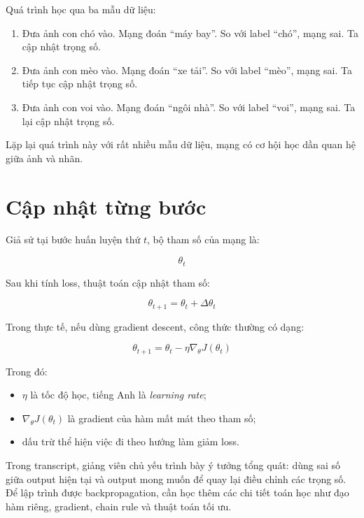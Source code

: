 \documentclass[12pt,a4paper]{report}
\begin{document}
\begin{vidu}
Quá trình học qua ba mẫu dữ liệu:

\begin{enumerate}
    \item Đưa ảnh con chó vào. Mạng đoán ``máy bay''. So với label ``chó'', mạng sai. Ta cập nhật trọng số.
    \item Đưa ảnh con mèo vào. Mạng đoán ``xe tải''. So với label ``mèo'', mạng sai. Ta tiếp tục cập nhật trọng số.
    \item Đưa ảnh con voi vào. Mạng đoán ``ngôi nhà''. So với label ``voi'', mạng sai. Ta lại cập nhật trọng số.
\end{enumerate}

Lặp lại quá trình này với rất nhiều mẫu dữ liệu, mạng có cơ hội học dần quan hệ giữa ảnh và nhãn.
\end{vidu}

\section{Cập nhật từng bước}

Giả sử tại bước huấn luyện thứ $t$, bộ tham số của mạng là:

\[
    \theta_t
\]

Sau khi tính loss, thuật toán cập nhật tham số:

\[
    \theta_{t+1} = \theta_t + \Delta \theta_t
\]

Trong thực tế, nếu dùng gradient descent, công thức thường có dạng:

\[
    \theta_{t+1} = \theta_t - \eta \nabla_{\theta} J(\theta_t)
\]

Trong đó:

\begin{itemize}
    \item $\eta$ là tốc độ học, tiếng Anh là \textit{learning rate};
    \item $\nabla_{\theta} J(\theta_t)$ là gradient của hàm mất mát theo tham số;
    \item dấu trừ thể hiện việc đi theo hướng làm giảm loss.
\end{itemize}

\begin{luuy}
Trong transcript, giảng viên chủ yếu trình bày ý tưởng tổng quát: dùng sai số giữa output hiện tại và output mong muốn để quay lại điều chỉnh các trọng số. Để lập trình được backpropagation, cần học thêm các chi tiết toán học như đạo hàm riêng, gradient, chain rule và thuật toán tối ưu.
\end{luuy}
\end{document}

